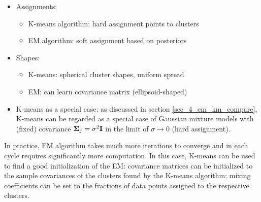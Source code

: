 \documentclass[../main.tex]{subfiles}
\begin{document}
\begin{itemize}
	\item Assignments:
	\begin{itemize}
		\item K-means algorithm: hard assignment points to clusters
		\item EM algorithm: soft assignment based on posteriors
	\end{itemize}
	\item Shapes:
	\begin{itemize}
		\item K-means: spherical cluster shapes, uniform spread
		\item EM: can learn covariance matrix (ellipsoid-shaped)
	\end{itemize}
	\item K-means as a special case: as discussed in section \ref{sec_4_em_km_compare}, K-means can be regarded as a special case of Gaussian mixture models with (fixed) covariance ${\bf \Sigma}_j=\sigma^2{\bf I}$ in the limit of $\sigma \rightarrow 0$ (hard assignment).
\end{itemize}
\par In practice, EM algorithm takes much more iterations to converge and in each cycle requires significantly more computation. In this case, K-means can be used to find a good initialization of the EM: covariance matrices can be initialized to the sample covariances of the clusters found by the K-means algorithm; mixing coefficients can be set to the fractions of data points assigned to the respective clusters.
\end{document}
